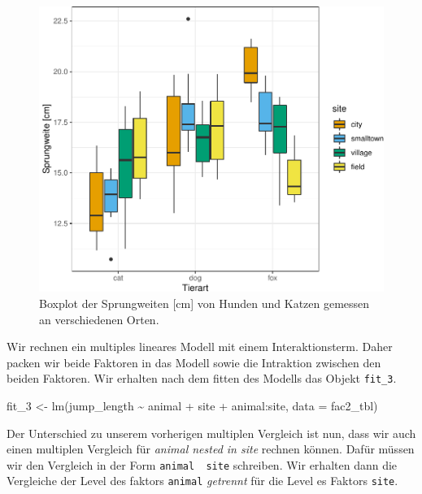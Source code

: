 \documentclass[
  letterpaper,
]{scrbook}
\newenvironment{Shaded}{\begin{snugshade}}{\end{snugshade}}
\newcommand{\AttributeTok}[1]{\textcolor[rgb]{0.40,0.45,0.13}{#1}}
\newcommand{\FunctionTok}[1]{\textcolor[rgb]{0.28,0.35,0.67}{#1}}
\newcommand{\NormalTok}[1]{\textcolor[rgb]{0.00,0.23,0.31}{#1}}
\newcommand{\OtherTok}[1]{\textcolor[rgb]{0.00,0.23,0.31}{#1}}
\newcommand{\SpecialCharTok}[1]{\textcolor[rgb]{0.37,0.37,0.37}{#1}}
\begin{document}
\begin{figure}

{\centering \includegraphics{./stat-tests-posthoc_files/figure-pdf/fig-boxplot-emmeans-1-1.pdf}

}

\caption{\label{fig-boxplot-emmeans-1}Boxplot der Sprungweiten {[}cm{]}
von Hunden und Katzen gemessen an verschiedenen Orten.}

\end{figure}

Wir rechnen ein multiples lineares Modell mit einem Interaktionsterm.
Daher packen wir beide Faktoren in das Modell sowie die Intraktion
zwischen den beiden Faktoren. Wir erhalten nach dem fitten des Modells
das Objekt \texttt{fit\_3}.

\begin{Shaded}
\begin{Highlighting}[]
\NormalTok{fit\_3 }\OtherTok{\textless{}{-}} \FunctionTok{lm}\NormalTok{(jump\_length }\SpecialCharTok{\textasciitilde{}}\NormalTok{ animal }\SpecialCharTok{+}\NormalTok{ site }\SpecialCharTok{+}\NormalTok{ animal}\SpecialCharTok{:}\NormalTok{site, }\AttributeTok{data =}\NormalTok{ fac2\_tbl)}
\end{Highlighting}
\end{Shaded}

Der Unterschied zu unserem vorherigen multiplen Vergleich ist nun, dass
wir auch einen multiplen Vergleich für \emph{animal nested in site}
rechnen können. Dafür müssen wir den Vergleich in der Form
\texttt{animal\ \textbar{}\ site} schreiben. Wir erhalten dann die
Vergleiche der Level des faktors \texttt{animal} \emph{getrennt} für die
Level es Faktors \texttt{site}.
\end{document}
